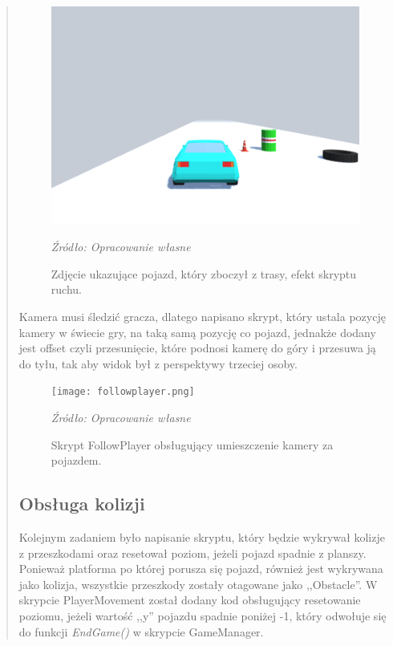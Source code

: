 \begin{quotation}
\begin{figure}[!h]
\centering
  \includegraphics[width=1\linewidth]{carmove.png}
  \caption{Zdjęcie ukazujące pojazd, który zboczył z trasy, efekt skryptu ruchu.}\label{rys_22}
  \begin{minipage}[t]{0.75\linewidth}
    \emph{Źródło: Opracowanie własne}
  \end{minipage}
\end{figure}

\indent Kamera musi śledzić gracza, dlatego napisano skrypt, który ustala pozycję kamery w świecie gry, na taką samą pozycję co pojazd, jednakże dodany jest offset czyli przesunięcie, które podnosi kamerę do góry i przesuwa ją do tyłu, tak aby widok był z perspektywy trzeciej osoby.

\begin{figure}[!h]
\centering
  \texttt{[image: followplayer.png]}
  \caption{Skrypt FollowPlayer obsługujący umieszczenie kamery za pojazdem.}\label{rys_23}
  \begin{minipage}[t]{0.75\linewidth}
    \emph{Źródło: Opracowanie własne}
  \end{minipage}
\end{figure}
\newpage
\subsection{Obsługa kolizji}
\indent Kolejnym zadaniem było napisanie skryptu, który będzie wykrywał kolizje z przeszkodami oraz resetował poziom, jeżeli pojazd spadnie z planszy. Ponieważ platforma po której porusza się pojazd, również jest wykrywana jako kolizja, wszystkie przeszkody zostały otagowane jako ,,Obstacle''. W skrypcie PlayerMovement został dodany kod obsługujący resetowanie poziomu, jeżeli wartość ,,y'' pojazdu spadnie poniżej -1, który odwołuje się do funkcji \textit{EndGame()} w skrypcie GameManager.


\end{quotation}
